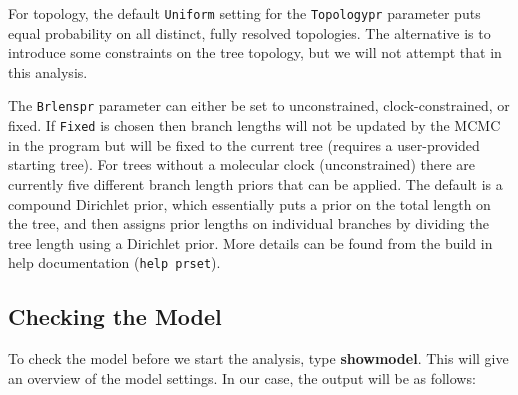 \documentclass[12pt]{book}
\begin{document}
For topology, the default \texttt{Uniform} setting for the \texttt{Topologypr} parameter puts equal
 probability on all distinct, fully resolved topologies. The alternative is to introduce some constraints
 on the tree topology, but we will not attempt that in this analysis.

The \texttt{Brlenspr} parameter can either be set to unconstrained, clock-constrained, or fixed. If 
 \texttt{Fixed} is chosen then branch lengths will not be updated by the MCMC in the program but will be
  fixed to the current tree (requires a user-provided starting tree).
 For trees without a molecular clock (unconstrained) there are currently five different branch length
 priors that can be applied. The default is a compound Dirichlet prior, which essentially puts a
 prior on the total length on the tree, and then assigns prior lengths on individual branches by
 dividing the tree length using a Dirichlet prior. More details can be found from the build in
 help documentation (\texttt{help prset}).
 

\subsection{Checking the Model}

To check the model before we start the analysis, type \textbf{showmodel}. This will give an overview of the
 model settings. In our case, the output will be as follows:
\end{document}
